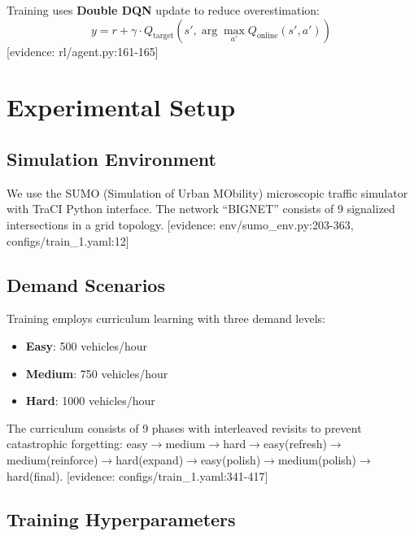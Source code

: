 Training uses \textbf{Double DQN} update to reduce overestimation:
\begin{equation}
y = r + \gamma \cdot Q_{\text{target}}(s', \arg\max_{a'} Q_{\text{online}}(s', a'))
\end{equation}
[evidence: rl/agent.py:161-165]


\section{Experimental Setup}
\label{sec:experimental_setup}

\subsection{Simulation Environment}

We use the SUMO (Simulation of Urban MObility) microscopic traffic simulator with TraCI Python interface. The network ``BIGNET'' consists of 9 signalized intersections in a grid topology.
[evidence: env/sumo\_env.py:203-363, configs/train\_1.yaml:12]

\subsection{Demand Scenarios}

Training employs curriculum learning with three demand levels:
\begin{itemize}
    \item \textbf{Easy}: 500 vehicles/hour
    \item \textbf{Medium}: 750 vehicles/hour  
    \item \textbf{Hard}: 1000 vehicles/hour
\end{itemize}
The curriculum consists of 9 phases with interleaved revisits to prevent catastrophic forgetting: easy$\to$medium$\to$hard$\to$easy(refresh)$\to$medium(reinforce)$\to$hard(expand)$\to$easy(polish)$\to$medium(polish)$\to$hard(final).
[evidence: configs/train\_1.yaml:341-417]

\subsection{Training Hyperparameters}

